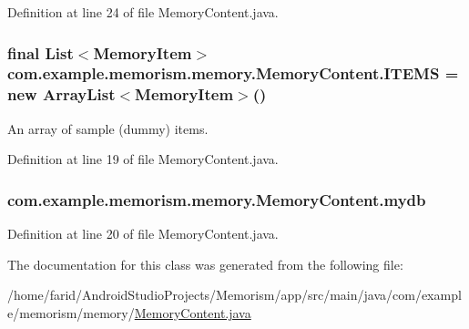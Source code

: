 Definition at line 24 of file Memory\+Content.\+java.

\subsubsection[{\texorpdfstring{I\+T\+E\+MS}{ITEMS}}]{\setlength{\rightskip}{0pt plus 5cm}final List$<$Memory\+Item$>$ com.\+example.\+memorism.\+memory.\+Memory\+Content.\+I\+T\+E\+MS = new Array\+List$<$Memory\+Item$>$()\hspace{0.3cm}{\ttfamily [static]}}\hypertarget{classcom_1_1example_1_1memorism_1_1memory_1_1_memory_content_a1bcc45e0adac63b034f3459da2efcf56}{}\label{classcom_1_1example_1_1memorism_1_1memory_1_1_memory_content_a1bcc45e0adac63b034f3459da2efcf56}
An array of sample (dummy) items. 

Definition at line 19 of file Memory\+Content.\+java.

\subsubsection[{\texorpdfstring{mydb}{mydb}}]{ com.\+example.\+memorism.\+memory.\+Memory\+Content.\+mydb\hspace{0.3cm}{\ttfamily [static]}}\hypertarget{classcom_1_1example_1_1memorism_1_1memory_1_1_memory_content_ae0b89ca96c4bb6c8544e45feebdee2df}{}\label{classcom_1_1example_1_1memorism_1_1memory_1_1_memory_content_ae0b89ca96c4bb6c8544e45feebdee2df}


Definition at line 20 of file Memory\+Content.\+java.



The documentation for this class was generated from the following file\+:\begin{DoxyCompactItemize}
\item 
/home/farid/\+Android\+Studio\+Projects/\+Memorism/app/src/main/java/com/example/memorism/memory/\hyperlink{_memory_content_8java}{Memory\+Content.\+java}\end{DoxyCompactItemize}
